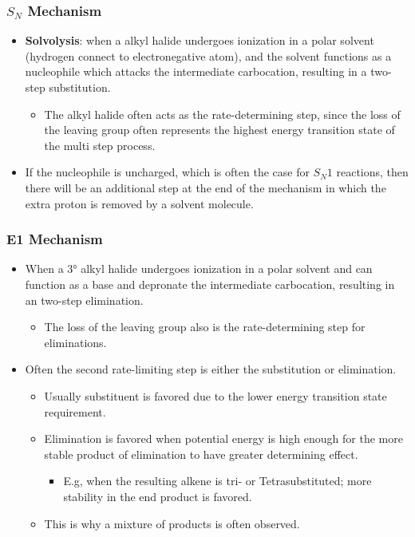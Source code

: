 \documentclass[12pt,a4paper]{article}
\begin{document}
\begin{itemize}
    \subsubsection{\texorpdfstring{\(S_N\) Mechanism}{Lg}}
    \begin{itemize}
        \item \textbf{Solvolysis}: when a alkyl halide undergoes ionization in a polar solvent (hydrogen connect to electronegative atom), and the solvent functions as a {\color{o-Sun}nucleophile} which attacks the intermediate carbocation, resulting in a two-step substitution.
            \begin{itemize}
                \item The {\color{o-Sun}alkyl halide} often acts as the {\color{o-Sun}rate-determining} step, since the loss of the leaving group often represents the highest energy transition state of the multi step process.
            \end{itemize}
        \item If the nucleophile is uncharged, which is often the case for \(S_N1\) reactions, then there will be an additional step at the end of the mechanism in which the extra proton is removed by a solvent molecule.
    \end{itemize}
    \subsubsection{E1 Mechanism}
    \begin{itemize}
        \item When a \ang{3} alkyl halide undergoes ionization in a polar solvent and can function as a {\color{o-Sun}base} and depronate the intermediate carbocation, resulting in an two-step elimination.
            \begin{itemize}
                \item The {\color{o-Sun}loss of the leaving group} also is the {\color{o-Sun}rate-determining} step for eliminations.
            \end{itemize}
        \item Often the second rate-limiting step is either the substitution or elimination.
            \begin{itemize}
                \item Usually substituent is favored due to the lower energy transition state requirement.
                \item Elimination is favored when potential energy is high enough for the more stable product of elimination to have greater determining effect.
                    \begin{itemize}
                        \item E.g, when the resulting alkene is tri- or Tetrasubstituted; more stability in the end product is favored.
                    \end{itemize}
                \item This is why a mixture of products is often observed.
            \end{itemize}
    \end{itemize}

\end{itemize}
\end{document}
